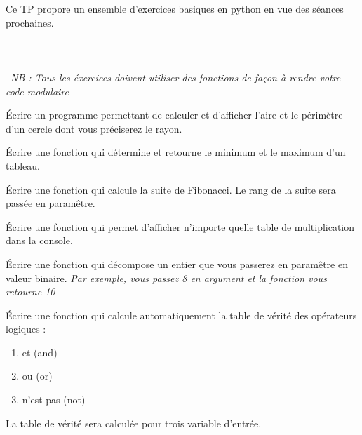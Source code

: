 \documentclass[12pt]{tdtp}
\begin{document}
\titre
Ce TP propore un ensemble d'exercices basiques en python en vue des séances prochaines.\\
\\
\\
\\\
\textit{NB : Tous les éxercices doivent utiliser des fonctions de façon à rendre votre code modulaire }

\Exo

Écrire un programme permettant de calculer et d'afficher l'aire et le périmètre d'un cercle dont vous préciserez le rayon.


\Exo


Écrire une fonction qui détermine et retourne le minimum et le maximum d'un tableau.


\Exo 

Écrire une fonction qui calcule la suite de Fibonacci. Le rang de la suite sera passée en paramêtre.


\Exo


Écrire une fonction qui permet d'afficher n'importe quelle table de multiplication dans la console.

\Exo

Écrire une fonction qui décompose un entier que vous passerez en paramêtre en valeur binaire. \textit{Par exemple, vous passez 8 en argument et la fonction vous retourne 10}


\Exo

Écrire une fonction qui calcule automatiquement la table de vérité des opérateurs logiques : 
\begin{enumerate}
	\item et (and)
	\item ou (or)
	\item n'est pas (not)
\end{enumerate}

La table de vérité sera calculée pour trois variable d'entrée.
\end{document}
